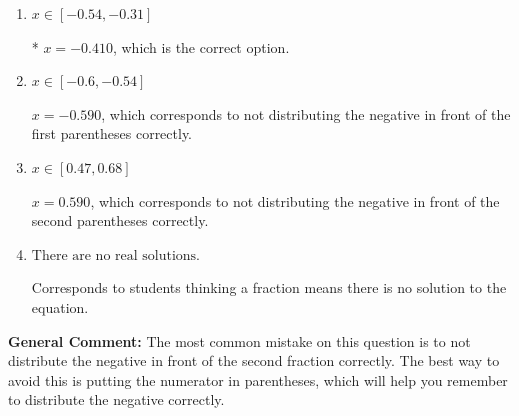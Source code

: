 \documentclass{extbook}[14pt]
\begin{document}
\begin{enumerate}
{\begin{enumerate}[label=\Alph*.]
$x = 0.958$, which corresponds to getting the negative of the actual solution.
\item \( x \in [-0.54, -0.31] \)

* $x = -0.410$, which is the correct option.
\item \( x \in [-0.6, -0.54] \)

$x = -0.590$, which corresponds to not distributing the negative in front of the first parentheses correctly.
\item \( x \in [0.47, 0.68] \)

$x = 0.590$, which corresponds to not distributing the negative in front of the second parentheses correctly.
\item \( \text{There are no real solutions.} \)

Corresponds to students thinking a fraction means there is no solution to the equation.
\end{enumerate}

\textbf{General Comment:} The most common mistake on this question is to not distribute the negative in front of the second fraction correctly. The best way to avoid this is putting the numerator in parentheses, which will help you remember to distribute the negative correctly.
}
\end{enumerate}
\end{document}
